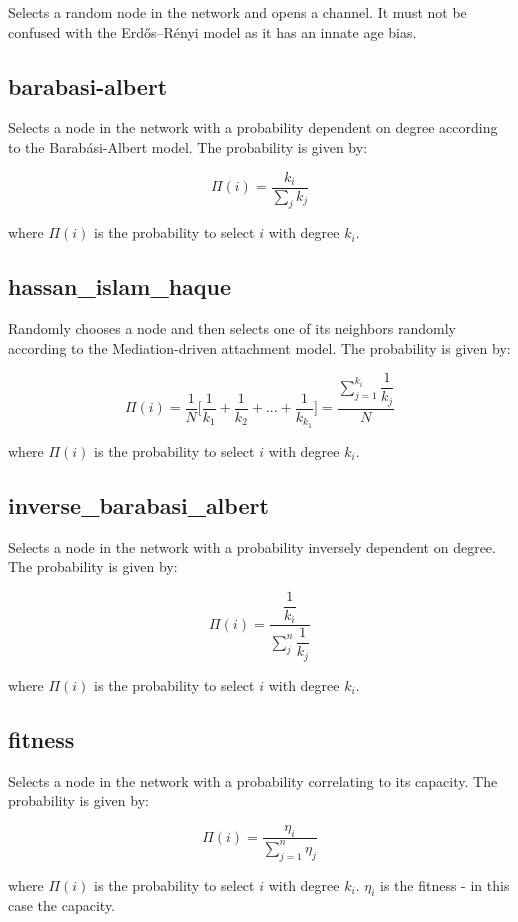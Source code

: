 Selects a random node in the network and opens a channel. It must not be confused with the Erdős–Rényi model as it has an innate age bias.

\subsection*{barabasi-albert}

Selects a node in the network with a probability dependent on degree according to the Barabási-Albert model. The probability is given by:

\[ \Pi(i) = \dfrac{k_i}{\sum_{j}^{}k_j}  \]

where $\Pi(i)$ is the probability to select $i$ with degree $k_i$.

\subsection*{hassan\_islam\_haque}

Randomly chooses a node and then selects one of its neighbors randomly according to the Mediation-driven attachment model. The probability is given by:

\[ \Pi(i) = \dfrac{1}{N} \bigg\lbrack \dfrac{1}{k_1} + \dfrac{1}{k_2} + ... + \dfrac{1}{k_{k_1}} \bigg\rbrack = \dfrac{\sum_{j=1}^{k_i}\dfrac{1}{k_j}}{N} \]

where $\Pi(i)$ is the probability to select $i$ with degree $k_i$.

\subsection*{inverse\_barabasi\_albert}

Selects a node in the network with a probability inversely dependent on degree. The probability is given by:

\[ \Pi(i) =  \dfrac{\dfrac{1}{k_i}}{\sum_{j}^{n} \dfrac{1}{k_j}} \]
 
where $\Pi(i)$ is the probability to select $i$ with degree $k_i$.

\subsection*{fitness}

Selects a node in the network with a probability correlating to its capacity. The probability is given by:

\[ \Pi(i) = \dfrac{\eta_i}{\sum_{j=1}^{n} \eta_j} \]

where $\Pi(i)$ is the probability to select $i$ with degree $k_i$. $\eta_i$ is the fitness - in this case the capacity. 

